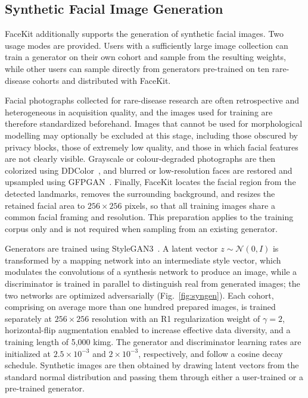 \documentclass[11pt]{article}
\begin{document}
\subsection{Synthetic Facial Image Generation}

FaceKit additionally supports the generation of synthetic facial images.
Two usage modes are provided. Users with a sufficiently large image
collection can train a generator on their own cohort and sample from the
resulting weights, while other users can sample
directly from generators pre-trained on ten rare-disease cohorts and
distributed with FaceKit.

Facial photographs collected for rare-disease research are often
retrospective and heterogeneous in acquisition quality, and the images used
for training are therefore standardized beforehand. Images that cannot be
used for morphological modelling may optionally be excluded at this stage,
including those obscured by privacy blocks, those of extremely low quality,
and those in which facial features are not clearly visible. Grayscale or
colour-degraded photographs are then colorized using DDColor~\cite{ddcolor},
and blurred or low-resolution faces are restored and upsampled using
GFPGAN~\cite{gfpgan}. Finally, FaceKit locates the facial region from the
detected landmarks, removes the surrounding background, and resizes the
retained facial area to $256\times256$ pixels, so that all training images
share a common facial framing and resolution. This preparation applies to
the training corpus only and is not required when sampling from an existing
generator.

Generators are trained using StyleGAN3~\cite{stylegan3}. A latent vector
$z \sim \mathcal{N}(0, I)$ is transformed by a mapping network into an
intermediate style vector, which modulates the convolutions of a synthesis
network to produce an image, while a discriminator is trained in parallel to
distinguish real from generated images; the two networks are optimized
adversarially (Fig.~\ref{fig:syngen}). Each cohort, comprising on average more than one hundred
prepared images, is trained separately at $256\times256$ resolution with an
R1 regularization weight of $\gamma = 2$, horizontal-flip augmentation
enabled to increase effective data diversity, and a training length of
5{,}000 kimg. The generator and discriminator learning rates are initialized
at $2.5\times10^{-3}$ and $2\times10^{-3}$, respectively, and follow a
cosine decay schedule. Synthetic images are then obtained by drawing latent
vectors from the standard normal distribution and passing them through
either a user-trained or a pre-trained generator.
\end{document}
